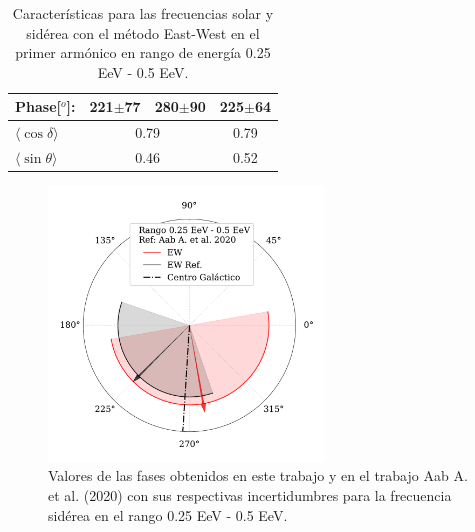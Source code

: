 \documentclass[11pt, letterpaper,oneside]{article}
\begin{document}
\begin{table}[H]
\begin{small}
\begin{center}
\begin{tabular}[c]{l|c|c||c|}
\multicolumn{1}{|l|}{Phase[$^o$]:                } & 221$\pm$77              & 280$\pm$90                & 225$\pm$64\\ \hline
\multicolumn{1}{|l|}{$\langle\cos\delta \rangle$} & \multicolumn{2}{c||}{0.79}        	                & 0.79 \cite{codigo}        \\        
\multicolumn{1}{|l|}{$\langle\sin\theta \rangle$} & \multicolumn{2}{c||}{0.46}        	                & 0.52 \cite{codigo}        \\ \hline       
            \end{tabular}
            
        \end{center}
    \end{small}
    \caption{Características para las frecuencias solar y sidérea con el método East-West en el primer armónico en rango de energía 0.25 EeV - 0.5 EeV.}
    \label{tab:primer_bin_data}
\end{table}

\begin{figure}[H]
    \begin{small}
        \begin{center}
            \vspace*{-1. cm}
            \includegraphics[width=0.65\textwidth]{Figs/phase_primer_bin_v3.pdf}
            \vspace*{-1 cm}
        \end{center}
        \caption{Valores de las fases obtenidos en este trabajo y en el trabajo Aab A. et al. (2020) \cite{Aab_2020} con sus respectivas incertidumbres para la frecuencia sidérea en el  rango 0.25 EeV - 0.5 EeV.}
        \label{fig:primer}
    \end{small}
\end{figure}
\end{document}
